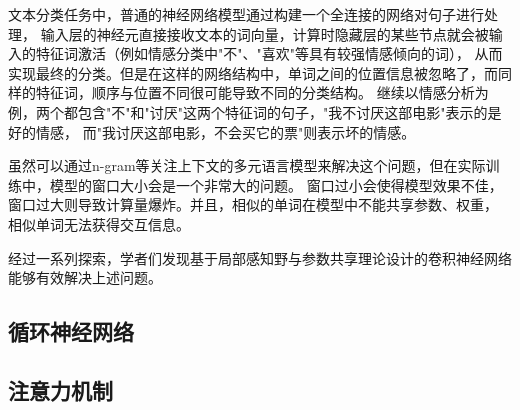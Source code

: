 文本分类任务中，普通的神经网络模型通过构建一个全连接的网络对句子进行处理，
输入层的神经元直接接收文本的词向量，计算时隐藏层的某些节点就会被输入的特征词激活（例如情感分类中"不"、"喜欢"等具有较强情感倾向的词），
从而实现最终的分类。但是在这样的网络结构中，单词之间的位置信息被忽略了，而同样的特征词，顺序与位置不同很可能导致不同的分类结构。
继续以情感分析为例，两个都包含"不"和"讨厌"这两个特征词的句子，"我不讨厌这部电影"表示的是好的情感，
而"我讨厌这部电影，不会买它的票"则表示坏的情感。

虽然可以通过n-gram等关注上下文的多元语言模型来解决这个问题，但在实际训练中，模型的窗口大小会是一个非常大的问题。
窗口过小会使得模型效果不佳，窗口过大则导致计算量爆炸。并且，相似的单词在模型中不能共享参数、权重，
相似单词无法获得交互信息。

经过一系列探索，学者们发现基于局部感知野与参数共享理论设计的卷积神经网络能够有效解决上述问题。

\subsection{循环神经网络}
\subsection{注意力机制}